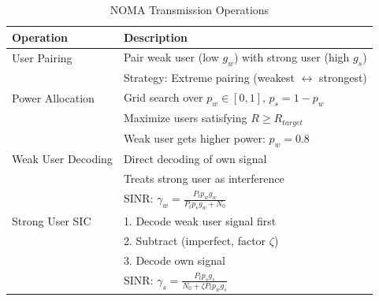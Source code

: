 \documentclass{article}
\begin{document}
\begin{table}[h]
\centering
\caption{NOMA Transmission Operations}
\label{tab:noma_ops}
\begin{tabular}{|l|p{8cm}|}
\hline
\textbf{Operation} & \textbf{Description} \\
\hline
User Pairing & Pair weak user (low $g_w$) with strong user (high $g_s$) \\
            & Strategy: Extreme pairing (weakest $\leftrightarrow$ strongest) \\
\hline
Power Allocation & Grid search over $p_w \in [0,1]$, $p_s = 1 - p_w$ \\
                & Maximize users satisfying $R \geq R_{target}$ \\
                & Weak user gets higher power: $p_w = 0.8$ \\
\hline
Weak User Decoding & Direct decoding of own signal \\
                   & Treats strong user as interference \\
                   & SINR: $\gamma_w = \frac{P_t p_w g_w}{P_t p_s g_w + N_0}$ \\
\hline
Strong User SIC & 1. Decode weak user signal first \\
                & 2. Subtract (imperfect, factor $\zeta$) \\
                & 3. Decode own signal \\
                & SINR: $\gamma_s = \frac{P_t p_s g_s}{N_0 + \zeta P_t p_w g_s}$ \\
\hline
\end{tabular}
\end{table}


\newpage
\end{document}
